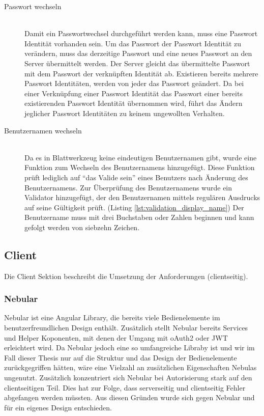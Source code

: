 \begin{description}
	\item[Passwort wechseln]\hfill\\
	Damit ein Passwortwechsel durchgeführt werden kann, muss eine Passwort Identität vorhanden sein. Um das Passwort der Passwort Identität zu verändern, muss das derzeitige Passwort und eine neues Passwort an den Server übermittelt werden. Der Server gleicht das übermittelte Passwort mit dem Passwort der verknüpften Identität ab. Existieren bereits mehrere Passwort Identitäten, werden von jeder das Passwort geändert. Da bei einer Verknüpfung einer Passwort Identität das Passwort einer bereits existierenden Passwort Identität übernommen wird, führt das Ändern jeglicher Passwort Identitäten zu keinem ungewollten Verhalten.
	\item[Benutzernamen wechseln]\hfill\\
	Da es in Blattwerkzeug keine eindeutigen Benutzernamen gibt, wurde eine Funktion zum Wechseln des Benutzernamens hinzugefügt. Diese Funktion prüft lediglich auf \enquote{das Valide sein} eines Benutzers nach Änderung des Benutzernamens. Zur Überprüfung des Benutzernamens wurde ein Validator hinzugefügt, der den Benutzernamen mittels regulären Ausdrucks auf seine Gültigkeit prüft. (Listing \ref{lst:validation_display_name}) Der Benutzername muss mit drei Buchstaben oder Zahlen beginnen und kann gefolgt werden von siebzehn Zeichen.

\end{description}



\subsection{Client}
\label{sec: client}
Die Client Sektion beschreibt die Umsetzung der Anforderungen (clientseitig). 

\subsubsection{Nebular}
\label{sec: nebular}
Nebular ist eine Angular Library, die bereits viele Bedienelemente im benutzerfreundlichen Design enthält. Zusätzlich stellt Nebular bereits Services und Helper Koponenten, mit denen der Umgang mit \gls{oAuth2} oder \gls{JWT} erleichtert wird. Da Nebular jedoch eine so umfangreiche Libraby ist und wir im Fall dieser Thesis nur auf die Struktur und das Design der Bedienelemente zurückgegriffen hätten, wäre eine Vielzahl an zusätzlichen Eigenschaften Nebulas ungenutzt. Zusätzlich konzentriert sich Nebular bei Autorisierung stark auf den clientseitigen Teil. Dies hat zur Folge, dass serverseitig und clientseitig Fehler abgefangen werden müssten. Aus diesen Gründen wurde sich gegen Nebular und für ein eigenes Design entschieden.

